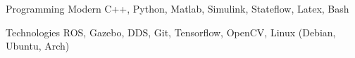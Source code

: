 
\begin{cvskills}

  \cvskill
    {Programming} %
    {Modern C++, Python, Matlab, Simulink, Stateflow, Latex, Bash} %

  \cvskill
    {Technologies} %
    {ROS, Gazebo, DDS, Git, Tensorflow, OpenCV, Linux (Debian, Ubuntu, Arch)} %


\end{cvskills}
